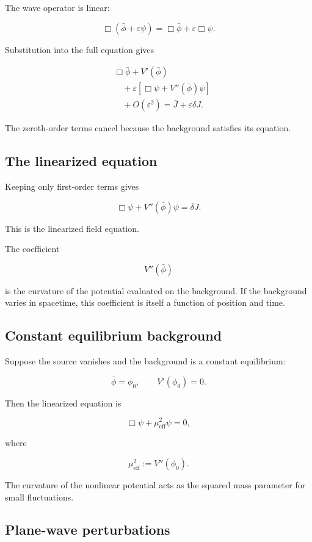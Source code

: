 The wave operator is linear:

\[
\Box(
\bar\phi+
\varepsilon\psi
)
=
\Box\bar\phi
+
\varepsilon\Box\psi.
\]

Substitution into the full equation gives

\[
\begin{aligned}
&\Box\bar\phi
+
V'(\bar\phi)\\
&\quad+
\varepsilon
\left[
\Box\psi
+
V''(\bar\phi)\psi
\right]\\
&\quad+
O(\varepsilon^{2})
=
\bar J
+
\varepsilon\delta J.
\end{aligned}
\]

The zeroth-order terms cancel because the background satisfies its equation.

\subsection{The linearized equation}

Keeping only first-order terms gives

\[
\boxed{
\Box\psi
+
V''(\bar\phi)\psi
=
\delta J
}.
\]

This is the linearized field equation.

The coefficient

\[
V''(\bar\phi)
\]

is the curvature of the potential evaluated on the background. If the background varies in spacetime, this coefficient is itself a function of position and time.

\subsection{Constant equilibrium background}

Suppose the source vanishes and the background is a constant equilibrium:

\[
\bar\phi=\phi_{0},
\qquad
V'(\phi_{0})=0.
\]

Then the linearized equation is

\[
\boxed{
\Box\psi
+
\mu_{\mathrm{eff}}^{2}\psi
=0
},
\]

where

\[
\boxed{
\mu_{\mathrm{eff}}^{2}
:=
V''(\phi_{0})
}.
\]

The curvature of the nonlinear potential acts as the squared mass parameter for small fluctuations.

\subsection{Plane-wave perturbations}


